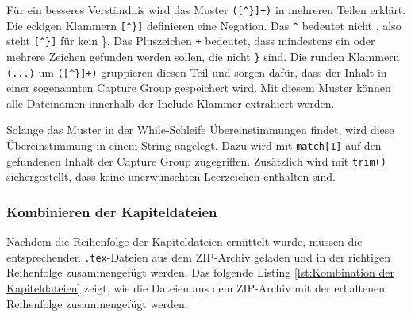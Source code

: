
Für ein besseres Verständnis wird das Muster \texttt{([\textasciicircum\}]+)} in mehreren Teilen erklärt. Die eckigen Klammern \texttt{[\textasciicircum\}]} definieren eine Negation. Das \texttt{\textasciicircum} bedeutet \glqq nicht \grqq{}, also steht \texttt{[\textasciicircum\}]} für \glqq kein \}\grqq{}. Das Pluszeichen \texttt{+} bedeutet, dass mindestens ein oder mehrere Zeichen gefunden werden sollen, die nicht \texttt{\}} sind. Die runden Klammern \texttt{(...)} um \texttt{([\textasciicircum\}]+)} gruppieren diesen Teil und sorgen dafür, dass der Inhalt in einer sogenannten Capture Group gespeichert wird. Mit diesem Muster können alle Dateinamen innerhalb der Include-Klammer extrahiert werden.

Solange das Muster in der While-Schleife Übereinstimmungen findet, wird diese Übereinstimmung in einem String angelegt. Dazu wird mit \texttt{match[1]} auf den gefundenen Inhalt der Capture Group zugegriffen. Zusätzlich wird mit \texttt{trim()} sichergestellt, dass keine unerwünschten Leerzeichen enthalten sind.

\subsubsection{Kombinieren der Kapiteldateien}

Nachdem die Reihenfolge der Kapiteldateien ermittelt wurde, müssen die entsprechenden \texttt{.tex}-Dateien aus dem ZIP-Archiv geladen und in der richtigen Reihenfolge zusammengefügt werden. Das folgende Listing \ref{lst:Kombination der Kapiteldateien} zeigt, wie die Dateien aus dem ZIP-Archiv mit der erhaltenen Reihenfolge zusammengefügt werden.

